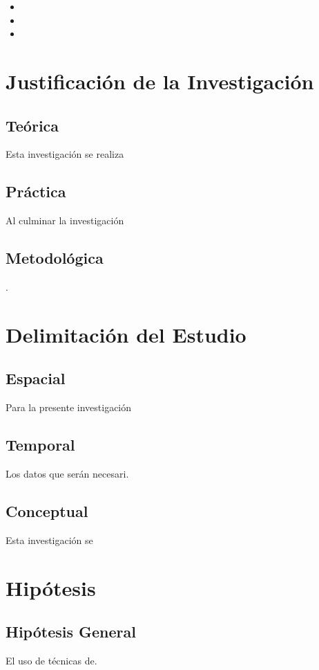 \begin{itemize}
	\item {\Objone}
	\item {\Objtwo}
	\item {\Objthree}
\end{itemize}

\section{Justificación de la Investigación}

\subsection{Teórica}
Esta investigación se realiza 

\subsection{Práctica}
Al culminar la investigación 

\subsection{Metodológica}. 

\section{Delimitación del Estudio}

\subsection{Espacial}
Para la presente investigación 

\subsection{Temporal}
Los datos que serán necesari. 

\subsection{Conceptual}
Esta investigación se 

\section{Hipótesis}

\subsection{Hipótesis General}
\newcommand{\HipotesisGeneral}{
El uso de técnicas de.
}
\HipotesisGeneral
